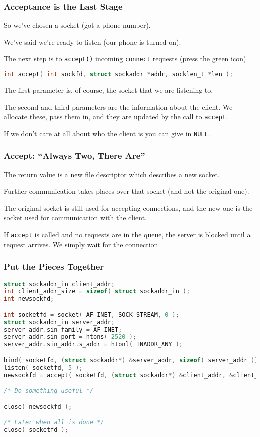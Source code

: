 \begin{frame}[fragile]
	\frametitle{Acceptance is the Last Stage}

	So we've chosen a socket (got a phone number).

	We've said we're ready to listen (our phone is turned on).

	The next step is to \texttt{accept()} incoming \texttt{connect} requests (press the green icon).

	\begin{lstlisting}[language=C]
int accept( int sockfd, struct sockaddr *addr, socklen_t *len ); 
\end{lstlisting}

	The first parameter is, of course, the socket that we are listening to.

	The second and third parameters are the information about the client. We allocate these, pass them in, and they are updated by the call to \texttt{accept}.

	If we don't care at all about who the client is you can give in \texttt{NULL}.

\end{frame}


\begin{frame}
	\frametitle{Accept: ``Always Two, There Are''}

	The return value is a new file descriptor which describes a new socket.

	Further communication takes places over that socket (and not the original one).

	The original socket is still used for accepting connections, and the new one is the socket used for communication with the client.

	If \texttt{accept} is called and no requests are in the queue, the server is blocked until a request arrives. We simply wait for the connection.

\end{frame}


\begin{frame}[fragile]
	\frametitle{Put the Pieces Together}

	\begin{lstlisting}[language=C]
struct sockaddr_in client_addr;
int client_addr_size = sizeof( struct sockaddr_in );
int newsockfd;

int socketfd = socket( AF_INET, SOCK_STREAM, 0 );
struct sockaddr_in server_addr;
server_addr.sin_family = AF_INET;
server_addr.sin_port = htons( 2520 );
server_addr.sin_addr.s_addr = htonl( INADDR_ANY );

bind( socketfd, (struct sockaddr*) &server_addr, sizeof( server_addr ));
listen( socketfd, 5 );
newsockfd = accept( socketfd, (struct sockaddr*) &client_addr, &client_addr_size );

/* Do something useful */

close( newsockfd );

/* Later when all is done */
close( socketfd );
\end{lstlisting}
\end{frame}


